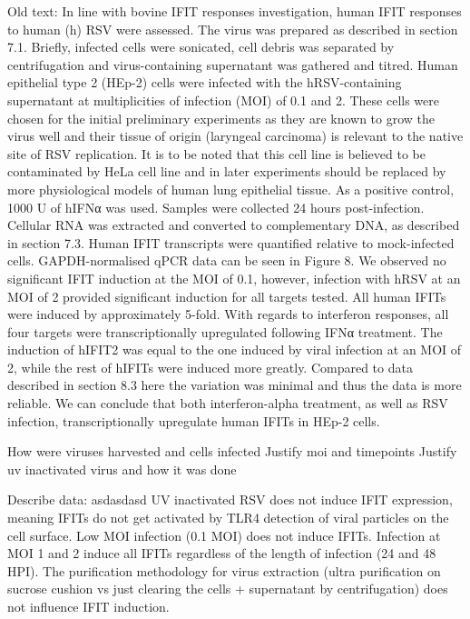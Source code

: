Old text:
In line with bovine IFIT responses investigation, human IFIT responses to human (h) RSV were assessed. The virus was prepared as described in section 7.1. Briefly, infected cells were sonicated, cell debris was separated by centrifugation and virus-containing supernatant was gathered and titred. Human epithelial type 2 (HEp-2) cells were infected with the hRSV-containing supernatant at multiplicities of infection (MOI) of 0.1 and 2. These cells were chosen for the initial preliminary experiments as they are known to grow the virus well and their tissue of origin (laryngeal carcinoma) is relevant to the native site of RSV replication. It is to be noted that this cell line is believed to be contaminated by HeLa cell line and in later experiments should be replaced by more physiological models of human lung epithelial tissue. As a positive control, 1000 U of hIFNα was used. Samples were collected 24 hours post-infection. Cellular RNA was extracted and converted to complementary DNA, as described in section 7.3. Human IFIT transcripts were quantified relative to mock-infected cells. GAPDH-normalised qPCR data can be seen in Figure 8. We observed no significant IFIT induction at the MOI of 0.1, however, infection with hRSV at an MOI of 2 provided significant induction for all targets tested. All human IFITs were induced by approximately 5-fold. With regards to interferon responses, all four targets were transcriptionally upregulated following IFNα treatment. The induction of hIFIT2 was equal to the one induced by viral infection at an MOI of 2, while the rest of hIFITs were induced more greatly. Compared to data described in section 8.3 here the variation was minimal and thus the data is more reliable. We can conclude that both interferon-alpha treatment, as well as RSV infection, transcriptionally upregulate human IFITs in HEp-2 cells.

How were viruses harvested and cells infected \newline
Justify moi and timepoints \newline
Justify uv inactivated virus and how it was done \newline

Describe data: \newline
asdasdasd \newline
UV inactivated RSV does not induce IFIT expression, meaning IFITs do not get activated by TLR4 detection of viral particles on the cell surface. Low MOI infection (0.1 MOI) does not induce IFITs. Infection at MOI 1 and 2 induce all IFITs regardless of the length of infection (24 and 48 HPI). The purification methodology for virus extraction (ultra purification on sucrose cushion vs just clearing the cells + supernatant by centrifugation) does not influence IFIT induction.

